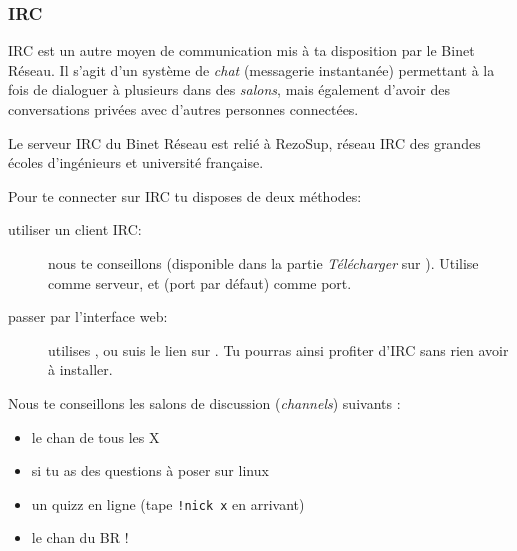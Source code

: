 
\subsubsection{IRC}

\label{irc}

IRC est un autre moyen de communication mis à ta disposition par le Binet Réseau. Il s'agit d'un système de \emph{chat} (messagerie instantanée)
permettant à la fois de dialoguer à plusieurs dans des \emph{salons}, mais également d'avoir des conversations privées avec d'autres personnes
connectées.

Le serveur IRC du Binet Réseau est relié à RezoSup, réseau IRC des grandes écoles d'ingénieurs et université française.

Pour te connecter sur IRC tu disposes de deux méthodes:

\begin{description}
  \item[utiliser un client IRC:] nous te conseillons  (disponible dans la partie \emph{Télécharger} sur \fkz). Utilise   comme serveur, et  (port par défaut) comme port.
  \item[passer par l'interface web:] utilises , ou suis le lien  sur \fkz. Tu pourras ainsi profiter d'IRC sans rien avoir à installer.
\end{description}

Nous te conseillons les salons de discussion (\emph{channels}) suivants :
\begin{itemize}
  \item {} le chan de tous les X
  \item {} si tu as des questions \`a poser sur linux
  \item {} un quizz en ligne (tape \texttt{!nick x} en arrivant)
  \item {} le chan du BR !
\end{itemize}
